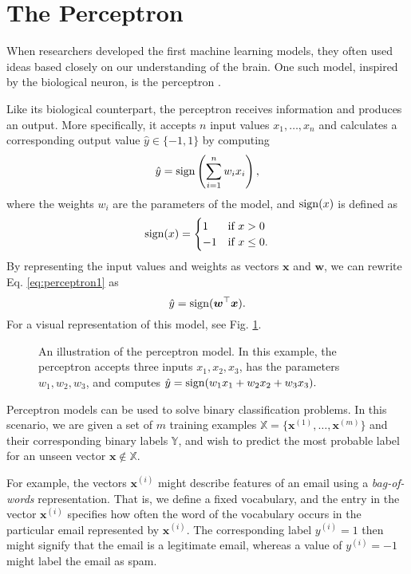 \section{The Perceptron}
\label{sec:perceptron}
When researchers developed the first machine learning models, they often used ideas based closely on our understanding of the brain. One such model, inspired by the biological neuron, is the perceptron \cite{McCulloch1943115}.

Like its biological counterpart, the perceptron receives information and produces an output. More specifically, it accepts $n$ input values $x_1, \ldots, x_n$ and calculates a corresponding output value $\hat{y} \in \{-1, 1\}$ by computing
\begin{equation}\label{eq:perceptron1}
	\hat{y} = \operatorname{sign}\left (\sum_{i=1}^{n} w_ix_i\right ),
\end{equation}
where the weights $w_i$ are the parameters of the model, and $\operatorname{sign}(x)$ is defined as
\begin{equation}
\operatorname{sign}(x) = \begin{cases} 1 & \text{if }x > 0
							\\-1 & \text{if }x \leq 0.
\end{cases}
\end{equation}
By representing the input values and weights as vectors $\bm{x}$ and $\bm{w}$, we can rewrite Eq. \eqref{eq:perceptron1} as
\begin{equation}
\hat{y} = \operatorname{sign}(\bm{w}^\top\bm{x}).
\end{equation}
For a visual representation of this model, see Fig. \ref{fig:perceptron}. 
\begin{figure}
	\begin{center}
		
	\end{center}
	\caption{An illustration of the perceptron model. In this example, the perceptron accepts three inputs $x_1, x_2, x_3$, has the parameters $w_1, w_2, w_3$, and computes $\hat{y} = \operatorname{sign}(w_1x_1 + w_2x_2 + w_3x_3).$}
	\label{fig:perceptron}
\end{figure}

Perceptron models can be used to solve binary classification problems. In this scenario, we are given a set of $m$ training examples $\mathbb{X} = \{\bm{x}^{(1)}, \ldots, \bm{x}^{(m)}\}$ and their corresponding binary labels $\mathbb{Y}$, and wish to predict the most probable label for an unseen vector $\bm{x} \notin \mathbb{X}$.

For example, the vectors $\bm{x}^{(i)}$ might describe features of an email using a \emph{bag-of-words} representation. That is, we define a fixed vocabulary, and the  entry in the vector $\bm{x}^{(i)}$ specifies how often the  word of the vocabulary occurs in the particular email represented by $\bm{x}^{(i)}$. The corresponding label $y^{(i)} = 1$ then might signify that the email is a legitimate email, whereas a value of $y^{(i)} = -1$ might label the email as spam.

